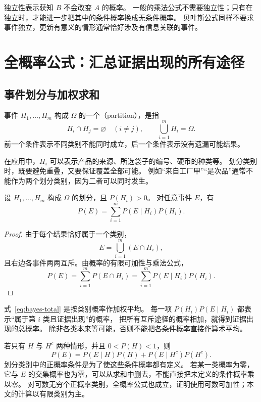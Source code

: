 \documentclass[UTF8]{ctexart}
\begin{document}
独立性表示获知 $B$ 不会改变 $A$ 的概率。
一般的乘法公式不需要独立性；只有在独立时，才能进一步把其中的条件概率换成无条件概率。
贝叶斯公式同样不要求事件独立，更新有意义的情形通常恰好涉及有信息关联的事件。

\section{全概率公式：汇总证据出现的所有途径}
\label{sec:bayes-total}

\subsection{事件划分与加权求和}

\begin{definition}[样本空间的有限划分]
事件 $H_1,\ldots,H_m$ 构成 $\Omega$ 的一个（partition），是指
\[
  H_i\cap H_j=\varnothing\quad(i\ne j),
  \qquad \bigcup_{i=1}^{m}H_i=\Omega.
\]
前一个条件表示不同类别不能同时成立，后一个条件表示没有遗漏可能结果。
\end{definition}

在应用中，$H_i$ 可以表示产品的来源、所选袋子的编号、硬币的种类等。
划分类别时，既要避免重叠，又要保证覆盖全部可能。
例如“来自工厂甲”“是次品”通常不能作为两个划分类别，因为二者可以同时发生。

\begin{theorem}[全概率公式]
\label{thm:bayes-total}
设 $H_1,\ldots,H_m$ 构成 $\Omega$ 的划分，且 $P(H_i)>0$。
对任意事件 $E$，有
\begin{equation}
  P(E)=\sum_{i=1}^{m}P(E\mid H_i)P(H_i).
  \label{eq:bayes-total}
\end{equation}
\end{theorem}
\begin{proof}
由于每个结果恰好属于一个类别，
\[
  E=\bigcup_{i=1}^{m}(E\cap H_i),
\]
且右边各事件两两互斥。由概率的有限可加性与乘法公式，
\[
  P(E)=\sum_{i=1}^{m}P(E\cap H_i)
      =\sum_{i=1}^{m}P(E\mid H_i)P(H_i).
\]
\end{proof}

式~\eqref{eq:bayes-total} 是按类别概率作加权平均。
每一项 $P(H_i)P(E\mid H_i)$ 都表示“属于第 $i$ 类且证据出现”的概率，
把所有互斥途径的概率相加，就得到证据出现的总概率。
除非各类本来等可能，否则不能把各条件概率直接作算术平均。

若只有 $H$ 与 $H^c$ 两种情形，并且 $0<P(H)<1$，则
\begin{equation}
  P(E)=P(E\mid H)P(H)+P(E\mid H^c)P(H^c).
  \label{eq:bayes-total-binary}
\end{equation}
划分类别中的正概率条件是为了使这些条件概率都有定义。
若某一类概率为零，它与 $E$ 的交集概率也为零，可以从求和中删去，不能直接把未定义的条件概率乘以零。
对可数无穷个正概率类别，全概率公式也成立，证明使用可数可加性；本文的计算以有限类别为主。
\end{document}
